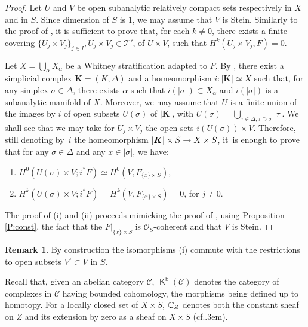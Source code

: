 \documentclass[english]{smfart}
\numberwithin{subsection}{section}
\newenvironment{enumeratei}
{\bgroup\def\theenumi{\roman{enumi}}\begin{enumerate}}
{\end{enumerate}\egroup}
\def\shc{\mathcal{C}}
\def\sho{\mathcal{O}}\let\cO\sho
\def\sht{\mathcal{T}}
\newcommand{\bK}{\boldsymbol{K}}
\newcommand{\rb}{\mathrm{b}}
\newcommand{\XS}{X\times S}
\DeclareMathOperator{\rK}{\mathsf{K}}
\def\cf{cf.\kern.3em}
\numberwithin{equation}{section}
\theoremstyle{plain}
\theoremstyle{definition}
\newtheorem{remark}[equation]{Remark}
\def\to{\mathchoice{\longrightarrow}{\rightarrow}{\rightarrow}{\rightarrow}}
\begin{document}
\begin{proof}
Let $U$ and $V$ be open subanalytic relatively compact sets respectively in $X$ and in $S$. Since dimension of $S$ is $1$, we may assume that $V$ is Stein. Similarly to the proof of \cite[Lem.\,2.1.1]{Prelli08}, it is sufficient to prove that, for each $k\neq 0$, there exists a finite covering $\{U_j\times V_j\}_{j\in I}, U_j\times V_j\in \sht'$, of
$U\times V$, such that $H^k(U_j\times V_j, F)=0$.

Let $X=\bigcup_{\alpha}X_{\alpha}$ be a Whitney stratification adapted to $F$. By \cite[Prop.\,8.2.5]{K-S90}, there exist a simplicial complex $\bK=(K, \Delta)$ and a homeomorphism $i: |\bK|\simeq X$ such that, for any simplex $\sigma\in\Delta$, there exists $\alpha$ such that $i(|\sigma|)\subset X_{\alpha}$ and $i(|\sigma|)$ is a subanalytic manifold of $X$. Moreover, we may assume that $U$ is a finite union of the images by
$i$ of open subsets $U(\sigma)$ of $|\bK|$, with $U(\sigma)=\bigcup_{\tau\in\Delta, \tau\supset \sigma}|\tau|$.
We shall see that we may take for $U_j\times V_j$ the open sets $i(U(\sigma))\times V$.
Therefore, still denoting by~$i$ the homeomorphism $|\bK|\times S\to \XS$, it~is enough to prove that for any $\sigma\in\Delta$ and any $x\in |\sigma|$, we have:
\begin{enumeratei}
\item
$H^0(U(\sigma)\times V; i^*F)\simeq H^0(V, F_{\{x\}\times S})$,
\item
$H^k(U(\sigma)\times V; i^*F)=H^k(V, F_{\{x\}\times S})=0$, for $j\neq 0$.
\end{enumeratei}

The proof of (i) and (ii) proceeds mimicking the proof of \cite[Prop.\,8.1.4]{K-S90}, using Proposition \ref{P:const}, the fact that the $F|_{\{x\}\times S}$ is $\sho_S$-coherent and that $V$ is Stein.
\end{proof}

\begin{remark}
By construction the isomorphisms (i) commute with the restrictions to open subsets $V'\subset V$ in $S$.
\end{remark}

Recall that, given an abelian category $\shc$, $\rK^{\rb}(\shc)$ denotes the category of complexes in $\shc$ having bounded cohomology, the morphisms being defined up to homotopy. For a locally closed set of $\XS$, $\mathbb{C}_Z$ denotes both the constant sheaf on $Z$ and its extension by zero as a sheaf on $\XS$ (\cf\cite[Prop.\,2.5.4]{K-S90}).
\end{document}
